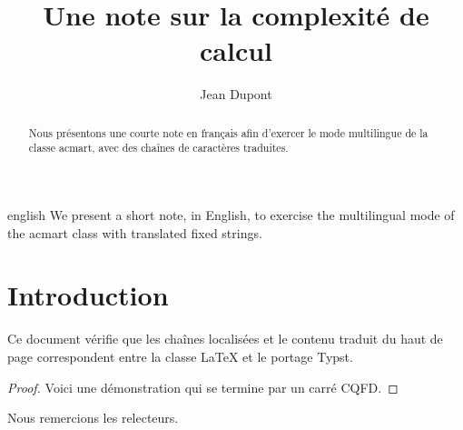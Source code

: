 \documentclass[acmsmall,language=french]{acmart}
\begin{document}
\title{Une note sur la complexité de calcul}

\author{Jean Dupont}

\renewcommand{\shortauthors}{Dupont}

\begin{abstract}
  Nous présentons une courte note en français afin d'exercer le mode multilingue
  de la classe acmart, avec des chaînes de caractères traduites.
\end{abstract}

\begin{translatedabstract}{english}
  We present a short note, in English, to exercise the multilingual mode of the
  acmart class with translated fixed strings.
\end{translatedabstract}


\maketitle

\section{Introduction}
Ce document vérifie que les chaînes localisées et le contenu traduit du haut de
page correspondent entre la classe LaTeX et le portage Typst.

\begin{proof}
Voici une démonstration qui se termine par un carré CQFD.
\end{proof}

\begin{acks}
Nous remercions les relecteurs.
\end{acks}
\end{document}
